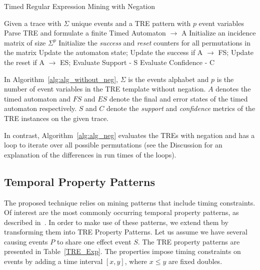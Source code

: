 \documentclass[]{sigplanconf}
\begin{document}
\begin{algorithm}[h]
    \caption{Timed Regular Expression Mining with Negation}
    \begin{algorithmic}[1]
     \Require  Given a trace with $\Sigma$ unique events and a TRE pattern with $p$ event variables
     \Ensure Parse TRE and formulate a finite Timed Automaton $\rightarrow$ A
     \State Initialize an incidence matrix of size $\Sigma^p$
     \State Initialize the \emph{success} and \emph{reset} counters for all permutations in the matrix
        \State Update the automaton state;
        \State Update the success if A $\rightarrow$ FS;
        \State Update the reset if A $\rightarrow$ ES;
   \EndFor
     \EndFor
     \State Evaluate Support - S
     \State Evaluate Confidence - C
    \end{algorithmic}
\label{alg:alg_neg}
\end{algorithm}

In Algorithm~\ref{alg:alg_without_neg}, $\Sigma$ is the events alphabet and $p$ is the number of event variables in the TRE template without negation. $A$ denotes the timed automaton and $FS$ and $ES$ denote the final and error states of the timed automaton respectively. $S$ and $C$ denote the \emph{support} and \emph{confidence} metrics of the TRE instances on the given trace.

In contrast, Algorithm~\ref{alg:alg_neg} evaluates the TREs with negation and has a loop to iterate over all possible permutations (see the Discussion for an explanation of the differences in run times of the loops).

\subsection{Temporal Property Patterns}

The proposed technique relies on mining patterns that include timing constraints. Of interest are the most commonly occurring temporal property patterns, as described in~\cite{evans1}. In order to make use of these patterns, we extend them by transforming them into TRE Property Patterns. Let us assume we have several causing events $P$ to share one effect event $S$. The TRE property patterns are presented in Table~\ref{TRE_Exp}. The properties impose timing constraints on events by adding a time interval $[x, y]$, where $x \le y$ are fixed doubles.
\end{document}
